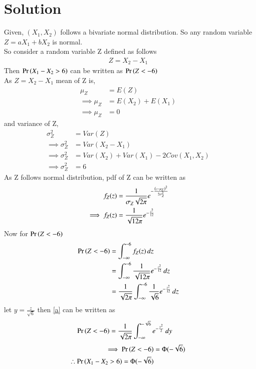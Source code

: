 \documentclass[journal,12pt,twocolumn]{IEEEtran}
\begin{document}
\section*{Solution}
Given, $(X_1,X_2)$ follows a bivariate normal distribution. So any random variable $Z=aX_1+bX_2$ is normal.\\
So consider a random variable Z defined as follows
\begin{align}
    Z=X_2-X_1
\end{align}
Then $\Pr\left(X_1-X_2>6\right)$ can be written as $\Pr\left(Z<-6\right)$\\
As $Z=X_2-X_1$ mean of Z is,
\begin{align}
    \mu_Z&=E(Z)\\
    \implies \mu_Z&=E(X_2)+E(X_1)\\
    \implies \mu_Z&=0
\end{align}
and variance of Z,
\begin{align}
    \sigma^2_{Z}&=Var(Z)\\
    \implies \sigma^2_{Z}&=Var(X_2-X_1)\\
    \implies \sigma^2_{Z}&=Var(X_2)+Var(X_1)-2Cov(X_1,X_2)\\
    \implies \sigma^2_{Z}&=6
\end{align}
As Z follows normal distribution, pdf of Z can be written as
\begin{align}
    f_Z(z)&=\frac{1}{\sigma_Z \sqrt{2\pi}}e^{-\frac{\left(z-\mu_Z\right)^2}{2\sigma_Z^2}}\\
    \implies f_Z(z)&=\frac{1}{ \sqrt{12\pi}}e^{-\frac{{z}^2}{12}}
\end{align}
Now for $\Pr\left(Z<-6\right)$
\begin{align}
    \Pr\left(Z<-6\right)&=\int_{-\infty}^{-6}f_Z(z)\,dz\\
             &=\int_{-\infty}^{-6}\frac{1}{ \sqrt{12\pi}}e^{-\frac{{z}^2}{12}}\,dz\\
             &=\frac{1}{ \sqrt{2\pi}}\int_{-\infty}^{-6}\frac{1}{ \sqrt{6}}e^{-\frac{{z}^2}{12}}\,dz
             \label{a}
\end{align}
let $y=\frac{z}{\sqrt{6}}$ then \eqref{a} can be written as
\begin{align}
    \Pr\left(Z<-6\right)&=\frac{1}{ \sqrt{2\pi}}\int_{-\infty}^{-\sqrt{6}}e^{-\frac{{y}^2}{2}}\,dy
\end{align}
\begin{align}
    \implies \Pr\left(Z<-6\right)&=\Phi(-\sqrt{6})\\
    \therefore \Pr\left(X_1-X_2>6\right)=\Phi(-\sqrt{6})
\end{align}
\end{document}
